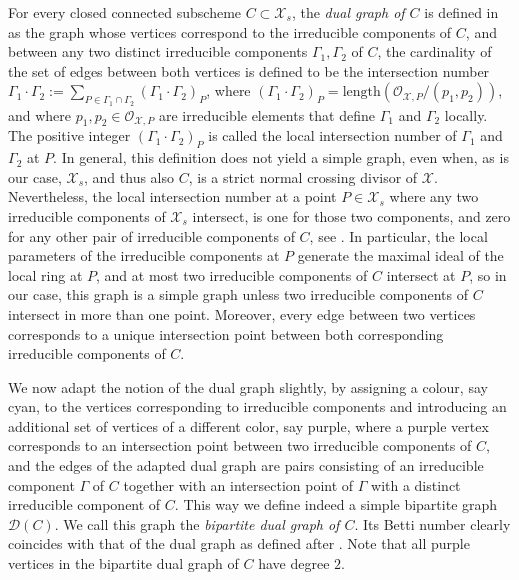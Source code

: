 \documentclass[a4paper,12pt,reqno]{amsart}
\newcommand\mc\mathcal
\theoremstyle{definition}
\numberwithin{equation}{thm}
\begin{document}
For every closed connected subscheme $C \subset \mc{X}_s$,  the \textit{dual graph of $C$} is defined in \cite[Definition 10.1.48]{Liu} as the graph whose vertices correspond to the irreducible components  of $C$, and between any two distinct irreducible components $\Gamma_1, \Gamma_2$ of $C$, the cardinality of the set of edges between both vertices is defined to be the intersection number $\Gamma_1 \cdot \Gamma_2:=\sum_{P\in \Gamma_1 \cap \Gamma_2} (\Gamma_1 \cdot \Gamma_2)_P$, where $(\Gamma_1 \cdot \Gamma_2)_P= \mathrm{length}(\mathcal{O}_{\mc{X},P}/(p_1,p_2))$, and where $p_1,p_2 \in \mathcal{O}_{\mc{X},P}$ are  irreducible elements that define $\Gamma_1$ and $\Gamma_2$ locally. The positive integer $(\Gamma_1 \cdot \Gamma_2)_P$ is called the local intersection number of $\Gamma_1$ and $\Gamma_2$ at $P$. In general, this definition does not yield a simple graph, even when,  
as is our case, $\mc{X}_s$, and thus also $C$, is a strict normal crossing divisor of $\mc{X}$. Nevertheless,
 the local intersection number at a point $P \in \mc{X}_s$ where any two irreducible components of $\mc{X}_s$  intersect, is one for those two components,  and zero for any other pair of irreducible components of $C$, see \cite[Proposition 9.1.8]{Liu}. In particular, the local  parameters of the irreducible components at $P$ generate the maximal ideal of the local ring at $P$, and at most two irreducible components of $C$ intersect at $P$, so in our case, this graph is a simple graph unless two irreducible components of $C$ intersect in more than one point.  Moreover, every edge between two vertices corresponds to a unique intersection point between both corresponding irreducible components of $C$. 
 
 We now adapt the notion of the dual graph slightly, by assigning a colour, say cyan, to the vertices corresponding to irreducible components  and introducing an additional set of vertices of a different color, say purple, where a purple vertex corresponds to an intersection point between two irreducible components of $C$, and the edges of the adapted dual graph are pairs consisting of an irreducible component $\Gamma$ of $C$ together with an intersection point of $\Gamma$ with a distinct irreducible component of $C$. This way we define indeed a  simple bipartite  graph $\mc{D}(C)$. We call this graph the \textit{bipartite dual graph of $C$}. Its Betti number clearly coincides with that of the dual graph as defined after .
 Note that all purple vertices in the bipartite dual graph of $C$ have degree $2$.
 
\end{document}
